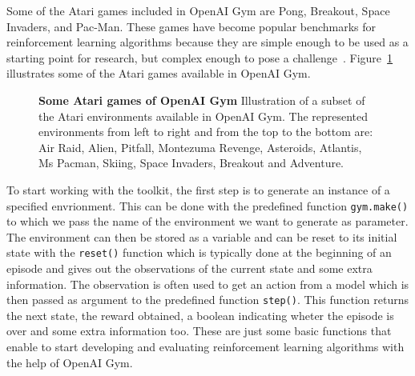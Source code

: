 Some of the Atari games included in OpenAI Gym are Pong, Breakout, Space Invaders, and Pac-Man. These games have become popular benchmarks for reinforcement learning algorithms because they are simple enough to be used as a starting point for research, but complex enough to pose a challenge~\cite{brockman_openai_2016}. Figure~\ref{fig:atari_games} illustrates some of the Atari games available in OpenAI Gym.

\begin{figure}[!ht]
\centering
{}
\caption[Atari games of OpenAI Gym]{
  \textbf{Some Atari games of OpenAI Gym}
  Illustration of a subset of the Atari environments available in OpenAI Gym. The represented environments from left to right and from the top to the bottom are: Air Raid, Alien, Pitfall, Montezuma Revenge, Asteroids, Atlantis, Ms Pacman, Skiing, Space Invaders, Breakout and Adventure.
 }
\label{fig:atari_games}
\end{figure}


To start working with the toolkit, the first step is to generate an instance of a specified envrionment. This can be done with the predefined function \texttt{gym.make()} to which we pass the name of the environment we want to generate as parameter. The environment can then be stored as a variable and can be reset to its initial state with the \texttt{reset()} function which is typically done at the beginning of an episode and gives out the observations of the current state and some extra information. The observation is often used to get an action from a model which is then passed as argument to the predefined function \texttt{step()}. This function returns the next state, the reward obtained, a boolean indicating wheter the episode is over and some extra information too. These are just some basic functions that enable to start developing and evaluating reinforcement learning algorithms with the help of OpenAI Gym.

